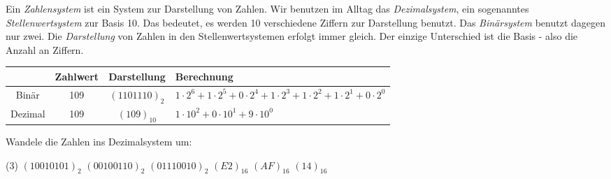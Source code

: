 \documentclass[9pt, a5paper, landscape, ngerman]{arbeitsblatt}
\begin{document}
\ReiheTitel

Ein \emph{Zahlensystem} ist ein System zur Darstellung von Zahlen. Wir
benutzen im Alltag das \emph{Dezimalsystem}, ein sogenanntes
\emph{Stellenwertsystem} zur Basis 10. Das bedeutet, es werden 10 verschiedene
Ziffern zur Darstellung benutzt. Das \emph{Binärsystem} benutzt dagegen nur zwei. Die \emph{Darstellung} von Zahlen in den Stellenwertsystemen erfolgt immer gleich. Der einzige Unterschied ist die Basis - also die Anzahl an Ziffern.

\begin{tabularx}{\textwidth}{c|c|c|X}
	        & Zahlwert  & Darstellung   & Berechnung                                                                     \\ \hline
	Binär   & \num{109} & $(1101110)_2$ & $1\cdot 2^6 + 1\cdot 2^5 + 0\cdot 2^4 + 1\cdot 2^3 + 1\cdot 2^2 + 1\cdot 2^1 +
	0\cdot 2^0$                                                                                                          \\ \hline
	Dezimal & \num{109} & $(109)_{10}$  & $1\cdot 10^2 + 0\cdot 10^1 + 9\cdot 10^0$
\end{tabularx}

\begin{aufgabe}
	Wandele die Zahlen ins Dezimalsystem um:
	\begin{tasks}(3)
		\task $(1001 0101)_2$ \task $(0010 0110)_2$ \task $(0111 0010)_2$
		\task $(E2)_{16}$ \task $(AF)_{16}$ \task $(14)_{16}$
	\end{tasks}

\end{aufgabe}
\end{document}
